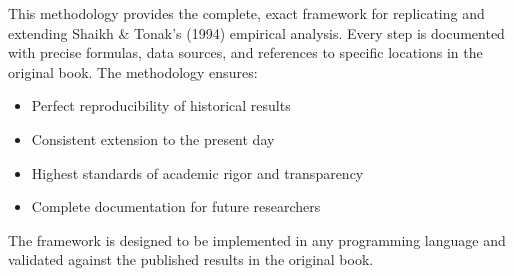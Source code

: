 \documentclass[12pt,a4paper]{article}
\begin{document}
This methodology provides the complete, exact framework for replicating and extending Shaikh \& Tonak's (1994) empirical analysis. Every step is documented with precise formulas, data sources, and references to specific locations in the original book. The methodology ensures:

\begin{itemize}
    \item Perfect reproducibility of historical results
    \item Consistent extension to the present day
    \item Highest standards of academic rigor and transparency
    \item Complete documentation for future researchers
\end{itemize}

The framework is designed to be implemented in any programming language and validated against the published results in the original book.
\end{document}
